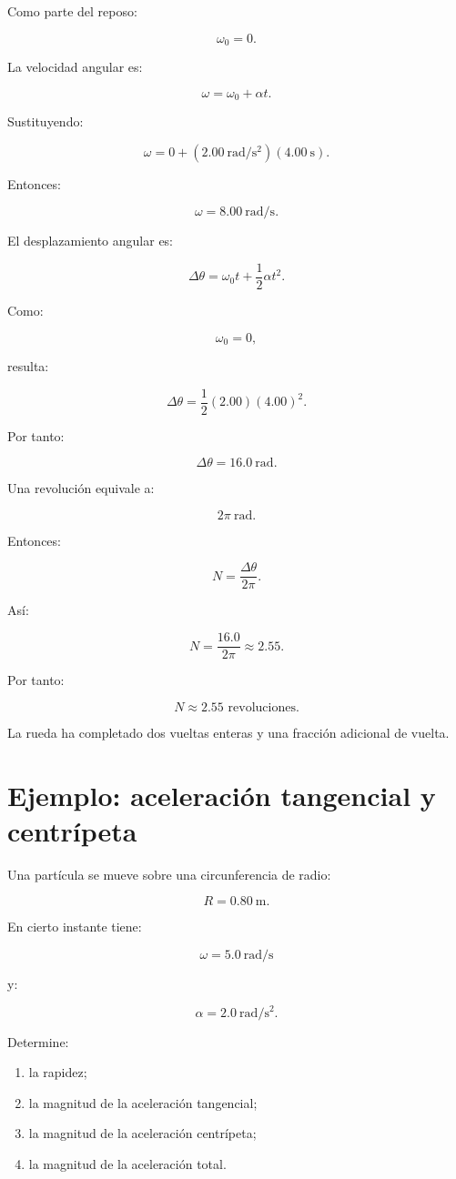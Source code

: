 Como parte del reposo:

\[
\omega_0=0.
\]

La velocidad angular es:

\[
\omega=\omega_0+\alpha t.
\]

Sustituyendo:

\[
\omega
=
0+
(\SI{2.00}{\radian\per\second\squared})
(\SI{4.00}{\second}).
\]

Entonces:

\[
\boxed{
\omega=\SI{8.00}{\radian\per\second}
}.
\]

El desplazamiento angular es:

\[
\Delta\theta
=
\omega_0t+\frac12\alpha t^2.
\]

Como:

\[
\omega_0=0,
\]

resulta:

\[
\Delta\theta
=
\frac12(2.00)(4.00)^2.
\]

Por tanto:

\[
\boxed{
\Delta\theta=\SI{16.0}{\radian}
}.
\]

Una revolución equivale a:

\[
2\pi\ \si{\radian}.
\]

Entonces:

\[
N
=
\frac{\Delta\theta}{2\pi}.
\]

Así:

\[
N
=
\frac{16.0}{2\pi}
\approx2.55.
\]

Por tanto:

\[
\boxed{N\approx2.55\text{ revoluciones}}.
\]

La rueda ha completado dos vueltas enteras y una fracción adicional de vuelta.


\section{Ejemplo: aceleración tangencial y centrípeta}

\begin{ejemplo}

Una partícula se mueve sobre una circunferencia de radio:

\[
R=\SI{0.80}{\meter}.
\]

En cierto instante tiene:

\[
\omega=\SI{5.0}{\radian\per\second}
\]

y:

\[
\alpha=\SI{2.0}{\radian\per\second\squared}.
\]

Determine:

\begin{enumerate}[label=\alph*)]
    \item la rapidez;
    \item la magnitud de la aceleración tangencial;
    \item la magnitud de la aceleración centrípeta;
    \item la magnitud de la aceleración total.
\end{enumerate}

\end{ejemplo}

